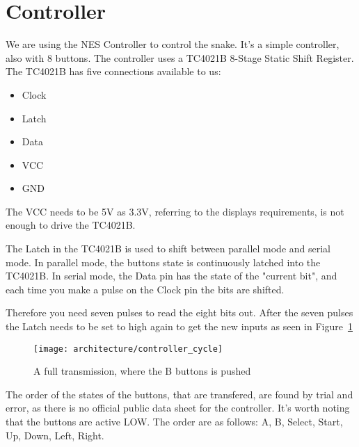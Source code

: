 \section{Controller}


We are using the NES Controller to control the snake. It's a simple controller, also with 8 buttons. The controller uses a TC4021B 8-Stage Static Shift Register. The TC4021B has five connections available to us\cite{toshiba:tc4021b}:
\begin{itemize}
\item Clock
\item Latch
\item Data
\item VCC
\item GND
\end{itemize}

The VCC needs to be 5V as 3.3V, referring to the displays requirements, is not enough to drive the TC4021B.

The Latch in the TC4021B is used to shift between parallel mode and serial mode. In parallel mode, the buttons state is continuously latched into the TC4021B. In serial mode, the Data pin has the state of the "current bit", and each time you make a pulse on the Clock pin the bits are shifted.

Therefore you need seven pulses to read the eight bits out. After the seven pulses the Latch needs to be set to high again to get the new inputs as seen in Figure~\ref{fig:controller_cycle}

\begin{figure}
\centering
\texttt{[image: architecture/controller\_cycle]}
\caption{A full transmission, where the B buttons is pushed}
\label{fig:controller_cycle}
\end{figure}

The order of the states of the buttons, that are transfered, are found by  trial and error, as there is no official public data sheet for the controller. It's worth noting that the buttons are active LOW. The order are as follows: A, B, Select, Start, Up, Down, Left, Right.

